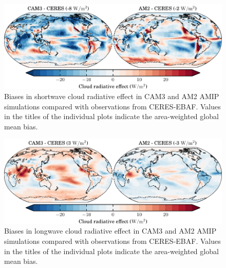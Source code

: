 \begin{figure}
    \centering
    \includegraphics{../graphics/swcrebiases_cmip3amip_map.pdf}
    \caption[Biases in shortwave cloud radiative effect in CAM3 and AM2 AMIP simulations compared with observations from CERES-EBAF.]{Biases in shortwave cloud radiative effect in CAM3 and AM2 AMIP simulations compared with observations from CERES-EBAF. Values in the titles of the individual plots indicate the area-weighted global mean bias.}
    \label{swcrebiases_cmip3amip_map}
\end{figure}

\begin{figure}
    \centering
    \includegraphics{../graphics/lwcrebiases_cmip3amip_map.pdf}
    \caption[Biases in longwave cloud radiative effect in CAM3 and AM2 AMIP simulations compared with observations from CERES-EBAF.]{Biases in longwave cloud radiative effect in CAM3 and AM2 AMIP simulations compared with observations from CERES-EBAF. Values in the titles of the individual plots indicate the area-weighted global mean bias.}
    \label{lwcrebiases_cmip3amip_map}
\end{figure}

